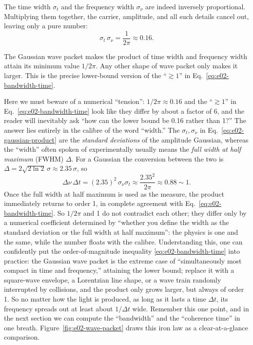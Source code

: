 The time width \(\sigma_t\) and the frequency width \(\sigma_\nu\) are indeed inversely proportional. Multiplying them together, the carrier, amplitude, and all such details cancel out, leaving only a pure number:
\begin{equation}
  \sigma_t\,\sigma_\nu=\frac{1}{2\pi}\approx0.16 .
  \label{eq:e02-gaussian-product}
\end{equation}
\begin{formulaexplain}
The Gaussian wave packet makes the product of time width and frequency width attain its minimum value \(1/2\pi\). Any other shape of wave packet only makes it larger. This is the precise lower-bound version of the ``\(\gtrsim 1\)'' in Eq.~\eqref{eq:e02-bandwidth-time}.
\end{formulaexplain}
Here we must beware of a numerical ``tension'': \(1/2\pi\approx0.16\) and the ``\(\gtrsim1\)'' in Eq.~\eqref{eq:e02-bandwidth-time} look like they differ by about a factor of 6, and the reader will inevitably ask ``how can the lower bound be 0.16 rather than 1?'' The answer lies entirely in the calibre of the word ``width.'' The \(\sigma_t,\sigma_\nu\) in Eq.~\eqref{eq:e02-gaussian-product} are the \emph{standard deviations} of the amplitude Gaussian, whereas the ``width'' often spoken of experimentally usually means the \emph{full width at half maximum} (FWHM) \(\Delta\). For a Gaussian the conversion between the two is \(\Delta=2\sqrt{2\ln2}\,\sigma\approx2.35\,\sigma\), so
\[
  \Delta\nu\,\Delta t=(2.35)^2\,\sigma_\nu\sigma_t
  \approx\frac{2.35^2}{2\pi}\approx0.88\sim1 .
\]
Once the full width at half maximum is used as the measure, the product immediately returns to order 1, in complete agreement with Eq.~\eqref{eq:e02-bandwidth-time}. So \(1/2\pi\) and 1 do not contradict each other; they differ only by a numerical coefficient determined by ``whether you define the width as the standard deviation or the full width at half maximum'': the physics is one and the same, while the number floats with the calibre. Understanding this, one can confidently put the order-of-magnitude inequality \eqref{eq:e02-bandwidth-time} into practice: the Gaussian wave packet is the extreme case of ``simultaneously most compact in time and frequency,'' attaining the lower bound; replace it with a square-wave envelope, a Lorentzian line shape, or a wave train randomly interrupted by collisions, and the product only grows larger, but always of order 1. So no matter how the light is produced, as long as it lasts a time \(\Delta t\), its frequency spreads out at least about \(1/\Delta t\) wide. Remember this one point, and in the next section we can compute the ``bandwidth'' and the ``coherence time'' in one breath. Figure~\ref{fig:e02-wave-packet} draws this iron law as a clear-at-a-glance comparison.

